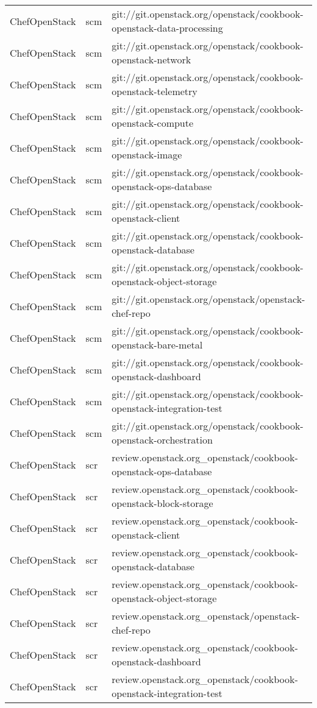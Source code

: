 \begin{center}
\begin{longtable}{|p{4cm}|p{1cm}|p{10cm}|}
ChefOpenStack&scm&git://git.openstack.org/openstack/cookbook-openstack-data-processing\\ 
ChefOpenStack&scm&git://git.openstack.org/openstack/cookbook-openstack-network\\ 
ChefOpenStack&scm&git://git.openstack.org/openstack/cookbook-openstack-telemetry\\ 
ChefOpenStack&scm&git://git.openstack.org/openstack/cookbook-openstack-compute\\ 
ChefOpenStack&scm&git://git.openstack.org/openstack/cookbook-openstack-image\\ 
ChefOpenStack&scm&git://git.openstack.org/openstack/cookbook-openstack-ops-database\\ 
ChefOpenStack&scm&git://git.openstack.org/openstack/cookbook-openstack-client\\ 
ChefOpenStack&scm&git://git.openstack.org/openstack/cookbook-openstack-database\\ 
ChefOpenStack&scm&git://git.openstack.org/openstack/cookbook-openstack-object-storage\\ 
ChefOpenStack&scm&git://git.openstack.org/openstack/openstack-chef-repo\\ 
ChefOpenStack&scm&git://git.openstack.org/openstack/cookbook-openstack-bare-metal\\ 
ChefOpenStack&scm&git://git.openstack.org/openstack/cookbook-openstack-dashboard\\ 
ChefOpenStack&scm&git://git.openstack.org/openstack/cookbook-openstack-integration-test\\ 
ChefOpenStack&scm&git://git.openstack.org/openstack/cookbook-openstack-orchestration\\ 
ChefOpenStack&scr&review.openstack.org\_openstack/cookbook-openstack-ops-database\\ 
ChefOpenStack&scr&review.openstack.org\_openstack/cookbook-openstack-block-storage\\ 
ChefOpenStack&scr&review.openstack.org\_openstack/cookbook-openstack-client\\ 
ChefOpenStack&scr&review.openstack.org\_openstack/cookbook-openstack-database\\ 
ChefOpenStack&scr&review.openstack.org\_openstack/cookbook-openstack-object-storage\\ 
ChefOpenStack&scr&review.openstack.org\_openstack/openstack-chef-repo\\ 
ChefOpenStack&scr&review.openstack.org\_openstack/cookbook-openstack-dashboard\\ 
ChefOpenStack&scr&review.openstack.org\_openstack/cookbook-openstack-integration-test\\ 

\end{longtable}
\end{center}

